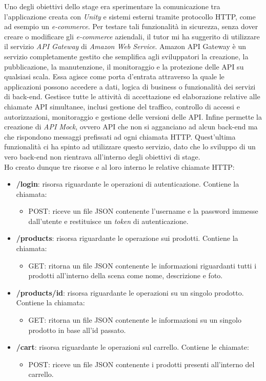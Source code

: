 Uno degli obiettivi dello stage era sperimentare la comunicazione tra l'applicazione creata con \textit{Unity} e sistemi esterni tramite protocollo HTTP, come ad esempio un \textit{e-commerce}. Per testare tali funzionalità in sicurezza, senza dover creare o modificare gli \textit{e-commerce} aziendali, il tutor mi ha suggerito di utilizzare il servizio \textit{API Gateway} di \textit{Amazon Web Service}. Amazon API Gateway è un servizio completamente gestito che semplifica agli sviluppatori la creazione, la pubblicazione, la manutenzione, il monitoraggio e la protezione delle API su qualsiasi scala. Essa agisce come porta d'entrata attraverso la quale le applicazioni possono accedere a dati, logica di business o funzionalità dei servizi di back-end. Gestisce tutte le attività di accettazione ed elaborazione relative alle chiamate API simultanee, inclusi gestione del traffico, controllo di accessi e autorizzazioni, monitoraggio e gestione delle versioni delle API. Infine permette la creazione di \textit{API Mock}, ovvero API che non si agganciano ad alcun back-end ma che rispondono messaggi prefissati ad ogni chiamata HTTP. Quest'ultima funzionalità ci ha spinto ad utilizzare questo servizio, dato che lo sviluppo di un vero back-end non rientrava all'interno degli obiettivi di stage. \\
Ho creato dunque tre risorse e al loro interno le relative chiamate HTTP:
\begin{itemize}
	\item \textbf{/login}: risorsa riguardante le operazioni di autenticazione. Contiene la chiamata:
	\begin{itemize}
		\item POST: riceve un file JSON contenente l'username e la password immesse dall'utente e restituisce un \textit{token} di autenticazione.
	\end{itemize}
	\item \textbf{/products}: risorsa riguardante le operazione sui prodotti. Contiene la chiamata:
	\begin{itemize}
		\item GET: ritorna un file JSON contenente le informazioni riguardanti tutti i prodotti all'interno della scena come nome, descrizione e foto.
	\end{itemize}
	\item \textbf{/products/{id}}: risorsa riguardante le operazioni su un singolo prodotto. Contiene la chiamata:
	\begin{itemize}
		\item GET: ritorna un file JSON contenente le informazioni su un singolo prodotto in base all'id passato. 
	\end{itemize}
	\item \textbf{/cart}: risorsa riguardante le operazioni sul carrello. Contiene le chiamate:
	\begin{itemize}
		\item POST: riceve un file JSON contenente i prodotti presenti all'interno del carrello.
	\end{itemize} 
\end{itemize}

